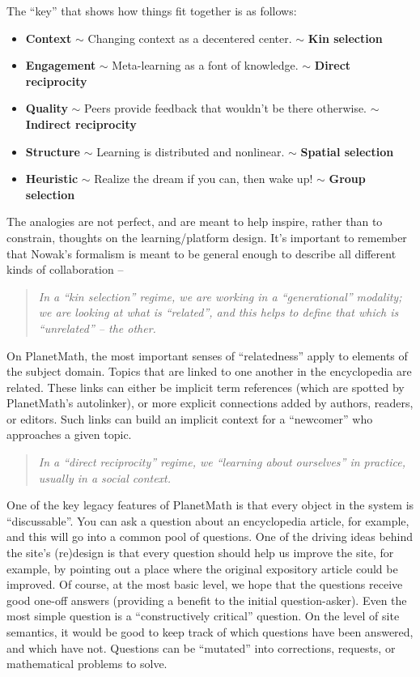 The
``key'' that shows how things fit together is as follows:

\begin{itemize}
\item
  \textbf{Context} \ensuremath{\sim} Changing context as a decentered
  center. \ensuremath{\sim} \textbf{Kin selection}
\item
  \textbf{Engagement} \ensuremath{\sim} Meta-learning as a font of
  knowledge. \ensuremath{\sim} \textbf{Direct reciprocity}
\item
  \textbf{Quality} \ensuremath{\sim} Peers provide feedback that
  wouldn't be there otherwise. \ensuremath{\sim} \textbf{Indirect
  reciprocity}
\item
  \textbf{Structure} \ensuremath{\sim} Learning is distributed and
  nonlinear. \ensuremath{\sim} \textbf{Spatial selection}
\item
  \textbf{Heuristic} \ensuremath{\sim} Realize the dream if you can,
  then wake up! \ensuremath{\sim} \textbf{Group selection}
\end{itemize}
The analogies are not perfect, and are meant to help inspire, rather
than to constrain, thoughts on the learning/platform design. It's
important to remember that Nowak's formalism is meant to be general
enough to describe all different kinds of collaboration --

\begin{quote}
\emph{In a ``kin selection'' regime, we are working in a
``generational'' modality; we are looking at what is ``related'', and
this helps to define that which is ``unrelated'' -- the other.}
\end{quote}
On PlanetMath, the most important senses of ``relatedness'' apply to
elements of the subject domain. Topics that are linked to one another in
the encyclopedia are related. These links can either be implicit term
references (which are spotted by PlanetMath's autolinker), or more
explicit connections added by authors, readers, or editors. Such links
can build an implicit context for a ``newcomer'' who approaches a given
topic.

\begin{quote}
\emph{In a ``direct reciprocity'' regime, we ``learning about
ourselves'' in practice, usually in a social context.}
\end{quote}
One of the key legacy features of PlanetMath is that every object in the
system is ``discussable''. You can ask a question about an encyclopedia
article, for example, and this will go into a common pool of questions.
One of the driving ideas behind the site's (re)design is that every
question should help us improve the site, for example, by pointing out a
place where the original expository article could be improved. Of
course, at the most basic level, we hope that the questions receive good
one-off answers (providing a benefit to the initial question-asker).
Even the most simple question is a ``constructively critical'' question.
On the level of site semantics, it would be good to keep track of which
questions have been answered, and which have not. Questions can be
``mutated'' into corrections, requests, or mathematical problems to
solve.

